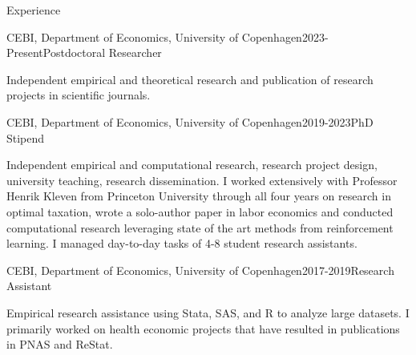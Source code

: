 \documentclass[
	10pt, %
]{resume} %
\begin{document}
\begin{rSection}{Experience}
    \begin{rSubsection}{CEBI, Department of Economics, University of Copenhagen}{2023-Present}{Postdoctoral Researcher}{}
        \item[] Independent empirical and theoretical research and publication of research projects in scientific journals.
    \end{rSubsection}

    \begin{rSubsection}{CEBI, Department of Economics, University of Copenhagen}{2019-2023}{PhD Stipend}{}
        \item[] Independent empirical and computational research, research project design, university teaching, research dissemination. I worked extensively with Professor Henrik Kleven from Princeton University through all four years on research in optimal taxation, wrote a solo-author paper in labor economics and conducted computational research leveraging state of the art methods from reinforcement learning. I managed day-to-day tasks of 4-8 student research assistants.
    \end{rSubsection}

    \begin{rSubsection}{CEBI, Department of Economics, University of Copenhagen}{2017-2019}{Research Assistant}{}
        \item[] Empirical research assistance using Stata, SAS, and R to analyze large datasets. I primarily worked on health economic projects that have resulted in publications in PNAS and ReStat.
    \end{rSubsection}


\end{rSection}
\end{document}
